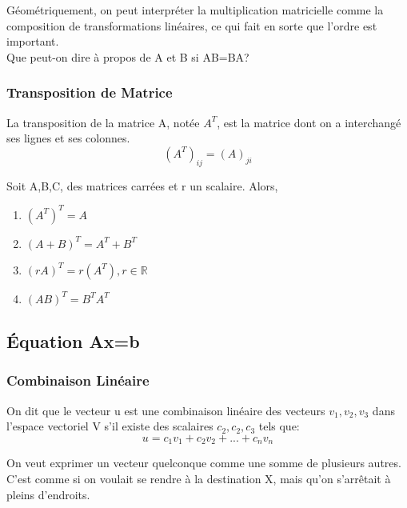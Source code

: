 \documentclass{article}
\begin{document}
\begin{remark}
    Géométriquement, on peut interpréter la multiplication matricielle
    comme la composition de transformations linéaires, ce qui fait en
    sorte que l'ordre est important.\\
    Que peut-on dire à propos de A et B si AB=BA?
\end{remark}

\subsubsection{Transposition de Matrice}

\begin{definition}[Transposition]
    La transposition de la matrice A, notée $A^T$, est la matrice dont on
    a interchangé ses lignes et ses colonnes. $$ (A^T)_{ij} = (A)_{ji}$$
\end{definition}

\begin{theorem}
    Soit A,B,C, des matrices carrées et r un scalaire. Alors,
    \begin{enumerate}
	\item $(A^T)^T = A$
	\item $ (A+B)^T = A^T + B^T$
	\item $ (rA)^T = r(A^T), r \in \mathbb{R}$
	\item $ (AB)^T = B^T A^T$
    \end{enumerate}
\end{theorem}

\subsection{Équation Ax=b}

\subsubsection{Combinaison Linéaire}

\begin{definition}
    On dit que le vecteur u est une combinaison linéaire des vecteurs
    $v_1, v_2, v_3$ dans l'espace vectoriel V s'il existe des scalaires
    $c_2, c_2, c_3$ tels que: $$ u = c_1 v_1 + c_2 v_2 + ... + c_n v_n$$
\end{definition}

\begin{intuition}
    On veut exprimer un vecteur quelconque comme une somme de plusieurs
    autres. C'est comme si on voulait se rendre à la destination X, mais
    qu'on s'arrêtait à pleins d'endroits.
\end{intuition}
\end{document}
